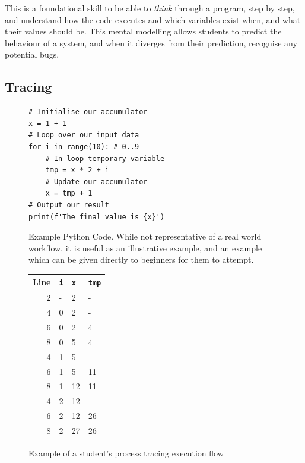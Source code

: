 \documentclass[paper=a4,]{tufte-handout}
\begin{document}
This is a foundational skill to be able to \emph{think} through a
program, step by step, and understand how the code executes and which
variables exist when, and what their values should be. This mental
modelling allows students to predict the behaviour of a system, and when
it diverges from their prediction, recognise any potential bugs.

\hypertarget{tracing}{%
\subsection{Tracing}\label{tracing}}

\begin{figure}[ht]
\begin{lstlisting}
# Initialise our accumulator
x = 1 + 1
# Loop over our input data
for i in range(10): # 0..9
    # In-loop temporary variable
    tmp = x * 2 + i
    # Update our accumulator
    x = tmp + 1
# Output our result
print(f'The final value is {x}')
\end{lstlisting}
\caption{Example Python Code. While not representative of a real world workflow, it is useful as an illustrative example, and an example which can be given directly to beginners for them to attempt.\label{fig:code}}
\end{figure}

\begin{figure}[ht]
    \begin{tabular}{r|lll}
        Line & \texttt{i} & \texttt{x} & \texttt{tmp} \\\hline
        2    & -          & 2          & - \\
        4    & 0          & 2          & - \\
        6    & 0          & 2          & 4 \\
        8    & 0          & 5          & 4 \\
        4    & 1          & 5          & - \\
        6    & 1          & 5          & 11 \\
        8    & 1          & 12         & 11 \\
        4    & 2          & 12         & - \\
        6    & 2          & 12         & 26 \\
        8    & 2          & 27         & 26 \\
\end{tabular}
\caption{Example of a student's process tracing execution flow\label{fig:table}}
\end{figure}
\end{document}
